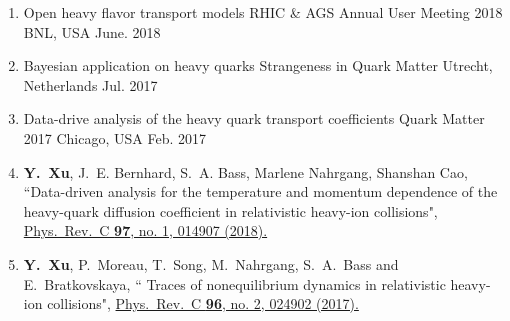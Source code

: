 

\begin{cventries}

\begin{enumerate}[wide, labelwidth=!, labelindent=0pt]
\item 
  \cvsubsubentry
    { Open heavy flavor transport models} %
    {RHIC \& AGS Annual User Meeting 2018} %
    {BNL, USA} %
    {June. 2018} %

\item 
  \cvsubsubentry
    { Bayesian application on heavy quarks} %
    {Strangeness in Quark Matter} %
    {Utrecht, Netherlands} %
    {Jul. 2017} %

\item 
  \cvsubsubentry
    { Data-drive analysis of the heavy quark transport coefficients} %
    {Quark Matter 2017} %
    {Chicago, USA} %
    {Feb. 2017} %



	\item 
	\cvpublication
	{\textbf{Y.~Xu}, J.~E. Bernhard, S.~A. Bass, Marlene Nahrgang, Shanshan Cao, }
	{``Data-driven analysis for the temperature and momentum dependence of the heavy-quark diffusion coefficient in relativistic heavy-ion collisions", } 
	{\href{https://journals.aps.org/prc/pdf/10.1103/PhysRevC.97.014907}{Phys.\ Rev.\ C {\bf 97}, no. 1, 014907 (2018).}}
	
	
	\item 
	\cvpublication
	{\textbf{Y.~Xu}, P.~Moreau, T.~Song, M.~Nahrgang, S.~A.~Bass and E.~Bratkovskaya, }
	{`` Traces of nonequilibrium dynamics in relativistic heavy-ion collisions", } {\href{https://journals.aps.org/prc/abstract/10.1103/PhysRevC.96.024902}{Phys.\ Rev.\ C {\bf 96}, no. 2, 024902 (2017).}}
	
\end{enumerate}














\end{cventries}
